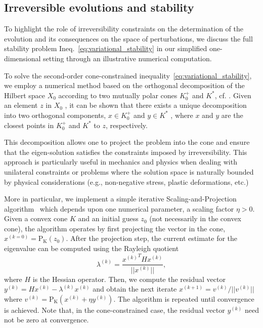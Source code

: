 \subsection{Irreversible evolutions and stability}
To highlight the role of irreversibility constraints on the determination of the evolution and its consequences on the space of perturbations, we discuss the full stability problem Ineq.~\eqref{eq:variational_stability} in our simplified one-dimensional setting through an illustrative numerical computation. 

To solve the second-order cone-constrained inequality~\eqref{eq:variational_stability}, we employ a numerical method based on the orthogonal decomposition of the Hilbert space  $X_0$  according to two mutually polar cones  $K^+_0$  and  $K^*$, cf. \cite{Moreau1962-fz}. Given an element  $z$  in  $X_0$ , it can be shown that there exists a unique decomposition into two orthogonal components,  $x \in K^+_0$  and  $y \in K^*$ , where  $x$  and  $y$  are the closest points in  $K^+_0$  and  $K^*$  to  $z$, respectively.

This decomposition allows one to project the problem into the cone and ensure that the eigen-solution satisfies the constraints imposed by irreversibility. This approach is particularly useful in mechanics and physics when dealing with unilateral constraints or problems where the solution space is naturally bounded by physical considerations (e.g., non-negative stress, plastic deformations, etc.) 

More in particular, we implement a simple iterative Scaling-and-Projection algorithm~\cite{Pinto_da_Costa2010-qv} which depends upon one numerical parameter, a scaling factor $\eta>0$. Given a convex cone  $K$ and an initial guess $z_0$ (not necessarily in the convex cone), the algorithm operates by first projecting the vector in the cone, $x^{(k=0)}= \operatorname{P_K}(z_0)$.  
After the projection step, the current estimate for the eigenvalue can be computed using the Rayleigh quotient
\begin{equation}
    \lambda^{(k)} = \frac{{x^{(k)}}^T H x^{(k)}}{||x^{(k)}||},
\end{equation}
where $H$ is the Hessian operator. Then, we compute the residual vector $y^{(k)} = H x^{(k)} - \lambda^{(k)} x^{(k)}$ and obtain the next iterate $x^{(k+1)} = v^{(k)}/||v^{(k)}||$ where 
$v^{(k)} =\operatorname{P_K} (x^{(k)} + \eta y^{(k)})$.
The algorithm is repeated until convergence is achieved. Note that, in the cone-constrained case, the residual vector $y^{(k)}$ need not be zero at convergence.

